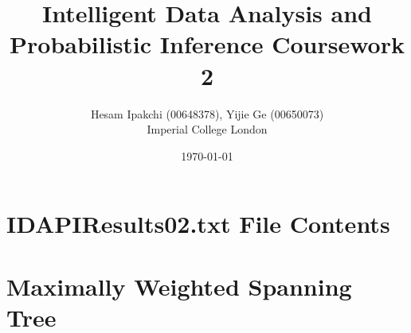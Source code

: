 \documentclass[12pt]{article}
\begin{document}
\nocite{*}


\title{\textbf{Intelligent Data Analysis and Probabilistic Inference Coursework 2}}
\author{Hesam Ipakchi (00648378), Yijie Ge (00650073)\\Imperial College London}
\date{\today}
\clearpage\maketitle
\thispagestyle{empty}


\newpage
\thispagestyle{plain}
\mbox{}


\section {IDAPIResults02.txt File Contents}
\label{sec:resultsFileContents}




\newpage
\thispagestyle{plain}
\mbox{}

\section {Maximally Weighted Spanning Tree}
\label{sec:maximallyWeightedSpanningTree}
\end{document}
